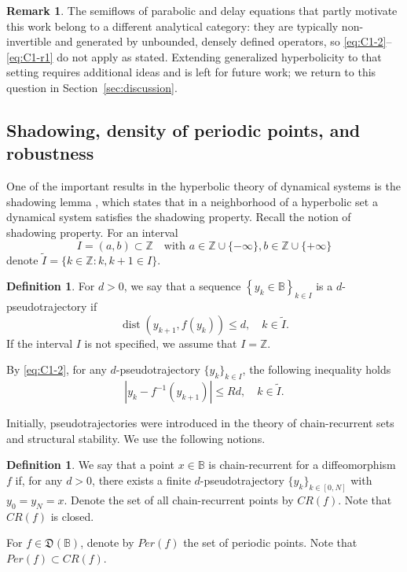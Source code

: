 \documentclass[12pt]{article}
\newcommand{\Bb}{\mathbb{B}}
\newcommand{\Zz}{\mathbb{Z}}
\newcommand{\DUC}{\mathfrak{D}}
\theoremstyle{definition}
\newtheorem{defin}[thm]{Definition}
\newtheorem{remark}[thm]{Remark}
\begin{document}
\begin{remark}
The semiflows of parabolic and delay equations that partly motivate this work belong to a different analytical category: they are typically non-invertible and generated by unbounded, densely defined operators, so \eqref{eq:C1-2}--\eqref{eq:C1-r1} do not apply as stated. Extending generalized hyperbolicity to that setting requires additional ideas and is left for future work; we return to this question in Section~\ref{sec:discussion}.
\end{remark}

\subsection{Shadowing, density of periodic points, and robustness}

One of the important results in the hyperbolic theory of dynamical systems is the shadowing lemma \cite{Anosov, Bowen}, which states that in a neighborhood of a hyperbolic set a dynamical system satisfies the shadowing property. Recall the notion of shadowing property.
For an interval 
\begin{equation}\label{eq:I}
I=(a, b) \subset \Zz \quad \mbox{with $a \in \mathbb{Z} \cup\{-\infty\}, b \in \mathbb{Z} \cup\{+\infty\}$}    
\end{equation}
denote $\tilde{I} = \{k \in \Zz: k, k+1 \in I\}$.

\begin{defin}
For $d>0$, we say that a sequence $\left\{y_{k} \in \Bb\right\}_{k \in I}$ is a $d$-pseudotrajectory if
\begin{equation}\label{eq:pst1}
\operatorname{dist}\left(y_{k+1}, f\left(y_{k}\right)\right) \leq d, \quad k \in \tilde{I}.
\end{equation}
If the interval $I$ is not specified, we assume that $I = \mathbb{Z}$.
\end{defin}
By \eqref{eq:C1-2}, for any $d$-pseudotrajectory $\{y_k\}_{k \in I}$, the following inequality holds 
\begin{equation}\label{eq:pst2}
|y_{k} - f^{-1}(y_{k+1})| \leq Rd, \quad k \in \tilde{I}.
\end{equation}

Initially, pseudotrajectories were introduced in the theory of chain-recurrent sets and structural stability. 
We use the following notions.
\begin{defin}
We say that a point $x \in \Bb$ is chain-recurrent for a diffeomorphism $f$ if, for any $d>0$, there exists a finite $d$-pseudotrajectory $\{y_k\}_{k \in [0, N]}$ with $y_0 = y_N = x$. Denote the set of all chain-recurrent points by $CR(f)$. Note that $CR(f)$ is closed.
\end{defin}
For $f \in \DUC(\Bb)$, denote by $Per(f)$ the set of periodic points. Note that $Per(f) \subset CR(f)$.
\end{document}
